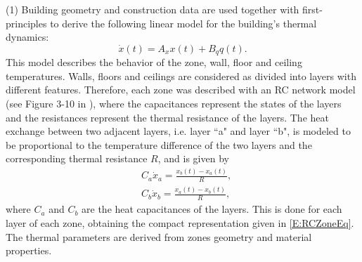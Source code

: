 \textcolor[rgb]{0,0,1}{(1) Building geometry and construction data are used together with first-principles to derive the following linear model for the building's thermal dynamics:
		\begin{equation}\label{E:RCZoneEq}
			\dot x(t) = A_x x(t) + B_q q(t).
		\end{equation}
		This model describes the behavior of the zone, wall, floor and ceiling temperatures.
		Walls, floors and ceilings are considered as divided into layers with different features. Therefore, each zone was described with an RC network model (see Figure 3-10 in \cite{SturzeneggerTR}), where the capacitances represent the states of the layers and the resistances represent the thermal resistance of the layers.
		The heat exchange between two adjacent layers, i.e. layer ``a" and layer ``b", is modeled to be proportional to the temperature difference of the two layers and the corresponding thermal resistance $R$, and is given by
		\begin{equation}\label{E:RCHeatExchange}
			\begin{aligned}
				&C_a\dot x_a = \frac{x_b(t) - x_a(t)}{R},\\
				&C_b\dot x_b =  \frac{x_a(t) - x_b(t)}{R},
			\end{aligned}
		\end{equation}
		where $C_a$ and $C_b$ are the heat capacitances of the layers. This is done for each layer of each zone, obtaining the compact representation given in \eqref{E:RCZoneEq}. The thermal parameters are derived from zones geometry and material properties.
}
		
